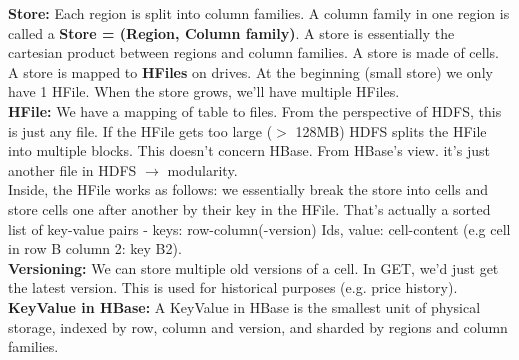 \documentclass[11pt,oneside,a4paper]{article}
\begin{document}
\textbf{Store:} Each region is split into column families. A column family in one region is called a \textbf{Store = (Region, Column family)}. A store is essentially the cartesian product between regions and column families. A store is made of cells. A store is mapped to \textbf{HFiles} on drives. At the beginning (small store) we only have 1 HFile. When the store grows, we'll have multiple HFiles.\\
\textbf{HFile:} We have a mapping of table to files. From the perspective of HDFS, this is just any file. If the HFile gets too large ($>$ 128MB) HDFS splits the HFile into multiple blocks. This doesn't concern HBase. From HBase's view. it's just another file in HDFS $\rightarrow$ modularity.\\
Inside, the HFile works as follows: we essentially break the store into cells and store cells one after another by their key in the HFile. That's actually a sorted list of key-value pairs - keys: row-column(-version) Ids, value: cell-content (e.g cell in row B column 2: key B2).\\
\textbf{Versioning:} We can store multiple old versions of a cell. In GET, we'd just get the latest version. This is used for historical purposes (e.g. price history).\\
\textbf{KeyValue in HBase:} A KeyValue in HBase is the smallest unit of physical storage, indexed by row, column and version, and sharded by regions and column families.
\end{document}
